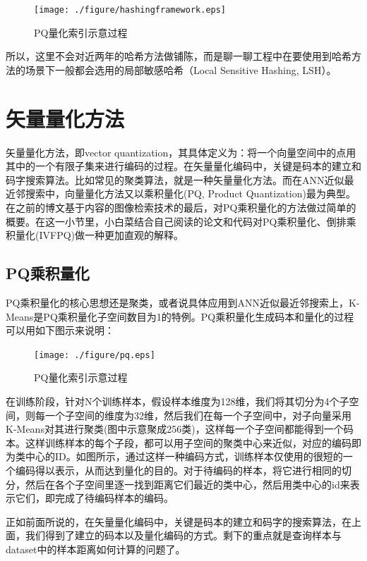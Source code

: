 \documentclass[color=cyan,mathpazo,titlestyle=hang]{elegantbook}
\begin{document}
\begin{figure}[!hbtp]
\centering  %
\texttt{[image: ./figure/hashingframework.eps]}
\caption{PQ量化索引示意过程\label{pq_ex1}}
\end{figure}

所以，这里不会对近两年的哈希方法做铺陈，而是聊一聊工程中在要使用到哈希方法的场景下一般都会选用的局部敏感哈希（Local Sensitive Hashing, LSH）。

\section{矢量量化方法}

矢量量化方法，即vector quantization，其具体定义为：将一个向量空间中的点用其中的一个有限子集来进行编码的过程。在矢量量化编码中，关键是码本的建立和码字搜索算法。比如常见的聚类算法，就是一种矢量量化方法。而在ANN近似最近邻搜索中，向量量化方法又以乘积量化(PQ, Product Quantization)最为典型。在之前的博文基于内容的图像检索技术的最后，对PQ乘积量化的方法做过简单的概要。在这一小节里，小白菜结合自己阅读的论文和代码对PQ乘积量化、倒排乘积量化(IVFPQ)做一种更加直观的解释。

\subsection{PQ乘积量化}

PQ乘积量化的核心思想还是聚类，或者说具体应用到ANN近似最近邻搜索上，K-Means是PQ乘积量化子空间数目为1的特例。PQ乘积量化生成码本和量化的过程可以用如下图示来说明：

\begin{figure}[!hbtp]
\centering  %
\texttt{[image: ./figure/pq.eps]}
\caption{PQ量化索引示意过程\label{pq_ex1}}
\end{figure}

在训练阶段，针对N个训练样本，假设样本维度为128维，我们将其切分为4个子空间，则每一个子空间的维度为32维，然后我们在每一个子空间中，对子向量采用K-Means对其进行聚类(图中示意聚成256类)，这样每一个子空间都能得到一个码本。这样训练样本的每个子段，都可以用子空间的聚类中心来近似，对应的编码即为类中心的ID。如图所示，通过这样一种编码方式，训练样本仅使用的很短的一个编码得以表示，从而达到量化的目的。对于待编码的样本，将它进行相同的切分，然后在各个子空间里逐一找到距离它们最近的类中心，然后用类中心的id来表示它们，即完成了待编码样本的编码。

正如前面所说的，在矢量量化编码中，关键是码本的建立和码字的搜索算法，在上面，我们得到了建立的码本以及量化编码的方式。剩下的重点就是查询样本与dataset中的样本距离如何计算的问题了。
\end{document}
